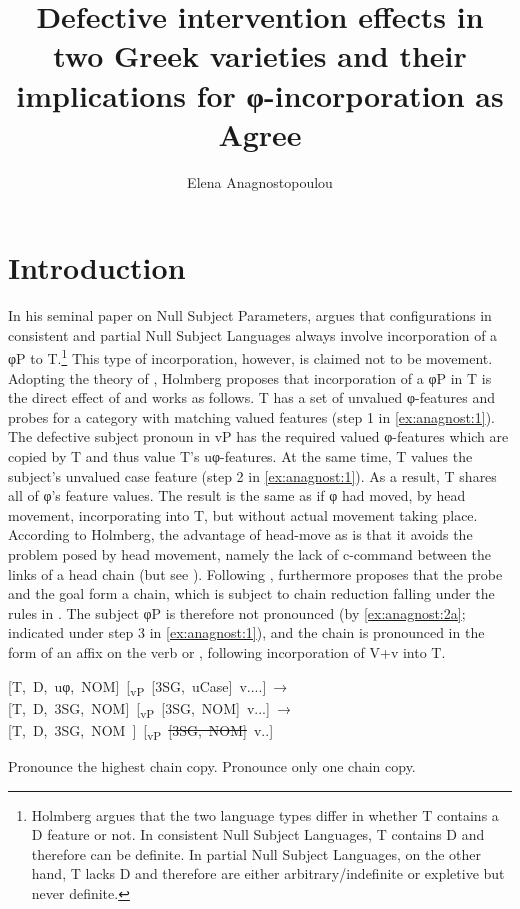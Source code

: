 \documentclass[output=paper]{LSP/langsci}
\author{Elena Anagnostopoulou 	\affiliation{University of Crete}}
\title{Defective intervention effects in two Greek varieties and their implications for φ-incorporation as Agree}
\begin{document}
 
\section{Introduction}
\largerpage[-2]
In his seminal paper on Null Subject Parameters, \citet{Holmberg2010Null} argues that  configurations in consistent and partial Null Subject Languages always involve incorporation of a φP to T.\footnote{Holmberg argues that the two language types differ in whether T contains a D feature or not. In consistent Null Subject Languages, T contains D and therefore  can be definite. In partial Null Subject Languages, on the other hand, T lacks D and therefore  are either arbitrary/indefinite or expletive but never definite.}  This type of incorporation, however, is claimed not to be movement. Adopting the theory of \citet{Roberts2010}, Holmberg proposes that incorporation of a φP in T is the direct effect of  \citep{Chomsky2001} and works as follows.   T has a set of unvalued φ-features and probes for a category with matching valued features (step 1 in \ref{ex:anagnost:1}). The defective subject pronoun in vP has the required valued φ-features which are copied by T and thus value T’s uφ-features. At the same time, T values the subject’s unvalued case feature (step 2 in \ref{ex:anagnost:1}). As a result, T shares all of φ’s feature values. The result is the same as if φ had moved, by head movement, incorporating into T, but without actual movement taking place. According to Holmberg, the advantage of head-move as  is that it avoids the problem posed by head movement, namely the lack of c-command between the links of a head chain (but see \citealt{Lechner2006,Lechner2007}). Following \citet{Roberts2010}, \citet{Holmberg2010Null} furthermore proposes that the probe and the goal form a chain, which is subject to chain reduction falling under the rules in . The subject φP is therefore not pronounced (by \ref{ex:anagnost:2a}; indicated under step 3 in \ref{ex:anagnost:1}), and the chain is pronounced in the form of an affix on the  verb or , following incorporation of V+v into T.

\ea
\begin{xlistn}\label{ex:anagnost:1}
\ex  \mbox{[T, D, uφ, NOM] [\textsubscript{vP} [3SG, uCase] v....] →}
\ex  \mbox{[T, D, 3SG, NOM] [\textsubscript{vP} [3SG, NOM] v...] →}
\ex  \mbox{[T, D, 3SG, NOM ] [\textsubscript{vP} \st{[3SG, NOM]} v..]}
\end{xlistn}
\z
\ea\label{ex:anagnost:2}
\begin{xlista}
  \ex \label{ex:anagnost:2a}  Pronounce the highest chain copy.
  \ex  Pronounce only one chain copy.
\end{xlista}
\z
\end{document}
